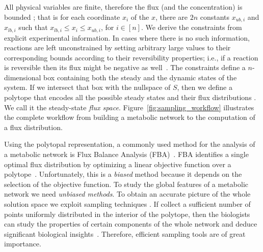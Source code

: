    All physical variables are finite, therefore  the flux (and the concentration)
   is bounded  \citep{palsson2015systems}; that is
   for each coordinate $x_i$ of the $x$, there are $2n$ constants
   $x_{ub, i}$ and  $x_{lb, i}$
   such that  $x_{lb,i} \le x_i \le x_{ub, i}$, for $i  \in [n]$.
   We derive the constraints from explicit experimental information.
   In cases where there is no such information, reactions are left unconstrained by
   setting arbitrary large values to their corresponding bounds according to their reversibility properties; i.e., if a reaction is reversible then its flux might be negative as well~\citep{lularevic2019improving}.
   The constraints define a $n$-dimensional box
   containing both the steady and the dynamic states of the system.
   If we intersect that box with the nullspace of
   $S$, then we define a polytope that encodes all the possible steady
   states and their  flux distributions \citep{palsson2015systems}.
   We call it the  steady-state \emph{flux space}.
   Figure~\ref{fig:sampling_workflow} illustrates the complete workflow from building a metabolic network to the computation of a flux distribution.
   
   Using the polytopal representation, a commonly used method for the analysis of a metabolic network is Flux Balance Analysis (FBA)~\citep{orth2010flux}.
   FBA identifies a single optimal flux distribution by optimizing a linear objective function over a polytope~\citep{orth2010flux}. Unfortunately, this is a \textit{biased} method because it depends on the  selection of the objective function.
   To study the  global features of a metabolic network we need \emph{unbiased methods}. To obtain  an accurate picture of the whole solution space we exploit sampling techniques \citep{schellenberger2009use}.
   If collect a sufficient number of points uniformly distributed in the interior of the polytope, then the biologists can study the properties of certain components of the whole network and deduce significant biological insights~\citep{palsson2015systems}. Therefore, efficient sampling tools are of great importance.
   
